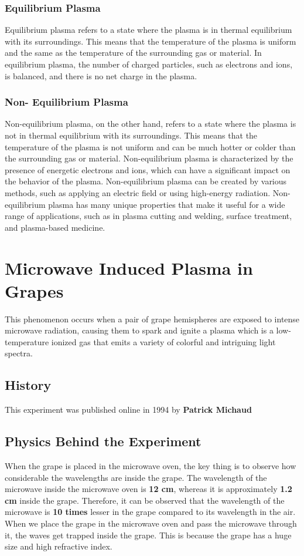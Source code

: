 \documentclass{article}
\begin{document}
\subsubsection{Equilibrium Plasma}
Equilibrium plasma refers to a state where the plasma is in thermal equilibrium with its surroundings. This means that the temperature of the plasma is uniform and the same as the temperature of the surrounding gas or material. In equilibrium plasma, the number of charged particles, such as electrons and ions, is balanced, and there is no net charge in the plasma.
\subsubsection{Non- Equilibrium Plasma}

Non-equilibrium plasma, on the other hand, refers to a state where the plasma is not in thermal equilibrium with its surroundings. This means that the temperature of the plasma is not uniform and can be much hotter or colder than the surrounding gas or material. Non-equilibrium plasma is characterized by the presence of energetic electrons and ions, which can have a significant impact on the behavior of the plasma. Non-equilibrium plasma can be created by various methods, such as applying an electric field or using high-energy radiation.
\cite{10}
Non-equilibrium plasma has many unique properties that make it useful for a wide range of applications, such as in plasma cutting and welding, surface treatment, and plasma-based medicine. 


\section{Microwave Induced Plasma in Grapes}

This phenomenon occurs when a pair of grape hemispheres are exposed to intense microwave radiation, causing them to spark and ignite a plasma which is a low-temperature ionized gas that emits a variety of colorful and intriguing light spectra. 

\subsection{History}
\large
This experiment was published online in 1994 by 
\textbf{Patrick Michaud}

\subsection{\Large Physics Behind the Experiment}
\large
When the grape is placed in the microwave oven, the key thing is to observe how considerable the wavelengths are inside the grape.
The wavelength of the microwave inside the microwave oven is \textbf{12 cm}, whereas it is approximately \textbf{1.2 cm} inside the grape. Therefore, it can be observed that the wavelength of the microwave is \textbf{10 times} lesser in the grape compared to its wavelength in the air.
When we place the grape in the microwave oven and pass the microwave through it, the waves get trapped inside the grape. This is because the grape has a huge size and high refractive index.
\end{document}
